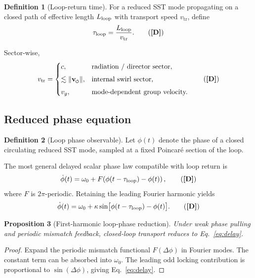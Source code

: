 \documentclass[11pt]{article}
\newcommand{\swirlarrow}{\mathchoice{\mkern-2mu\scriptstyle\boldsymbol{\circlearrowleft}}{\mkern-2mu\scriptstyle\boldsymbol{\circlearrowleft}}{\mkern-2mu\scriptscriptstyle\boldsymbol{\circlearrowleft}}{\mkern-2mu\scriptscriptstyle\boldsymbol{\circlearrowleft}}}
\newcommand{\vswirl}{\mathbf{v}_{\swirlarrow}}
\newcommand{\tauloop}{\tau_\textrm{loop}}
\newcommand{\vtr}{v_\textrm{tr}}
\newcommand{\TagD}{\textbf{[D]}} %
\theoremstyle{definition}
\newtheorem{definition}{Definition}[section]
\theoremstyle{plain}
\newtheorem{proposition}[definition]{Proposition}
\begin{document}
\begin{definition}[Loop-return time]
For a reduced SST mode propagating on a closed path of effective length \(L_{\rm loop}\) with transport speed \(\vtr\), define
\begin{equation}
\tauloop=\frac{L_{\rm loop}}{\vtr}.
\tag{\TagD}
\label{eq:tau}
\end{equation}
\end{definition}

Sector-wise,
\begin{equation}
\vtr=
\begin{cases}
c, & \text{radiation / director sector},\\[4pt]
\lesssim \norm{\vswirl}, & \text{internal swirl sector},\\[4pt]
v_g, & \text{mode-dependent group velocity.}
\end{cases}
\tag{\TagD}
\label{eq:vtr}
\end{equation}

\subsection{Reduced phase equation}

\begin{definition}[Loop phase observable]
Let \(\phi(t)\) denote the phase of a closed circulating reduced SST mode, sampled at a fixed Poincar\'e section of the loop.
\end{definition}

The most general delayed scalar phase law compatible with loop return is
\begin{equation}
\dot{\phi}(t)=\omega_0+F\!\left(\phi(t-\tauloop)-\phi(t)\right),
\tag{\TagD}
\label{eq:generic}
\end{equation}
where \(F\) is \(2\pi\)-periodic. Retaining the leading Fourier harmonic yields
\begin{equation}
\dot{\phi}(t)
=
\omega_0+\kappa\sin\!\big[\phi(t-\tauloop)-\phi(t)\big].
\tag{\TagD}
\label{eq:delay}
\end{equation}

\begin{proposition}[First-harmonic loop-phase reduction]
Under weak phase pulling and periodic mismatch feedback, closed-loop transport reduces to Eq.~\eqref{eq:delay}.
\end{proposition}

\begin{proof}
Expand the periodic mismatch functional \(F(\Delta\phi)\) in Fourier modes. The constant term can be absorbed into \(\omega_0\). The leading odd locking contribution is proportional to \(\sin(\Delta\phi)\), giving Eq.~\eqref{eq:delay}.
\end{proof}
\end{document}
